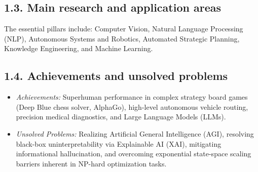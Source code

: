 \documentclass[../main.tex]{subfiles}
\begin{document}
\subsection{1.3. Main research and application areas}
The essential pillars include: Computer Vision, Natural Language Processing (NLP), Autonomous Systems and Robotics, Automated Strategic Planning, Knowledge Engineering, and Machine Learning.

\subsection{1.4. Achievements and unsolved problems}
\begin{itemize}
    \item \textit{Achievements:} Superhuman performance in complex strategy board games (Deep Blue chess solver, AlphaGo), high-level autonomous vehicle routing, precision medical diagnostics, and Large Language Models (LLMs).
    \item \textit{Unsolved Problems:} Realizing Artificial General Intelligence (AGI), resolving black-box uninterpretability via Explainable AI (XAI), mitigating informational hallucination, and overcoming exponential state-space scaling barriers inherent in NP-hard optimization tasks.
\end{itemize}
\end{document}
